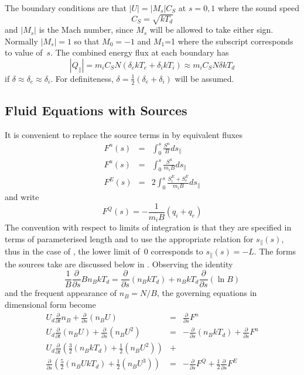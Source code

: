 The boundary conditions are that $|U|=|M_s| C_S$ at $s=0,1$ where the sound speed
\begin{equation}
C_S= \sqrt{kT_d}
\end{equation}
and $|M_s|$ is the Mach number, since $M_s$ will be allowed to take either sign. Normally $|M_s|=1$
so that $M_0=-1$ and $M_1$=1 where the subscript corresponds to value of~$s$.
The combined energy flux at each boundary has
\begin{equation}
|Q_{\parallel}|=m_i C_S N (\delta_e kT_e + \delta_i kT_i) \approx
m_i C_S N \delta kT_d
\end{equation}
if $\delta \approx \delta_e \approx \delta_i$. For definiteness, $\delta=\frac{1}{2}(\delta_e+\delta_i)$
will be assumed.

\subsection{Fluid Equations with Sources}\label{sec:sys23fluid}
It is convenient to replace the source terms in  by equivalent fluxes
\begin{eqnarray}\label{eq:sound}
F^n(s)&=&\int_0^s \frac{S^n}{B} ds_{\parallel}\\
F^u(s)&=&\int_0^s \frac{S^u}{m_i B} ds_{\parallel} \label{eq:souud}\\
F^E(s)&=&2\int_0^s\frac{S_i^E+S_e^E}{m_i B} ds_{\parallel} \label{eq:soutd}
\end{eqnarray}
and write
\begin{equation}\label{eq:fQd}
F^Q(s)=-\frac{1}{m_i B} (q_i + q_e)
\end{equation}
The convention with respect to limits of integration is that they are specified in terms
of parameterised length and to use the
appropriate relation for $s_{\parallel}(s)$, thus in the case of , the
lower limit of~$0$ corresponds to $s_{\parallel}(s)=-L$.
The forms the sources take are discussed below in . 
Observing the identity
\begin{equation}
\frac{1}{B}\frac{\partial}{\partial s} Bn_B kT_d = \frac{\partial}{\partial s} (n_B kT_d)+ n_B kT_d
\frac{\partial}{\partial s} (\ln B)
\end{equation}
and the frequent appearance of $n_B=N/B$, the governing equations in dimensional form become
\begin{eqnarray}\label{eq:sysnd}
U_d \frac{\partial}{\partial t} n_B  + 
\frac{\partial}{\partial s} (n_B U )&=& \frac{\partial}{\partial s} F^n\\
U_d \frac{\partial}{\partial t} (n_B U)+ 
\frac{\partial}{\partial s} (n_B U^2)&=&
-\frac{\partial}{\partial s} (n_B kT_d) +\frac{\partial}{\partial s} F^u \label{eq:sysud}\\
U_d \frac{\partial}{\partial t}\left( \frac{3}{2}(n_B kT_d)+
\frac{1}{2} (n_B U^2) \right) &+&\\
\frac{\partial}{\partial s} \left( \frac{5}{2}(n_B U kT_d) +
\frac{1}{2} (n_B U^3) \right)  &=&
-\frac{\partial}{\partial s} F^Q +
\frac{1}{2} \frac{\partial}{\partial s} F^E \label{eq:systd}
\end{eqnarray}
